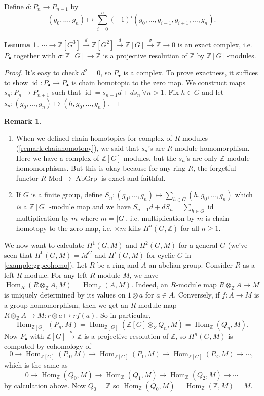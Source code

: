 \documentclass{article}
\newcommand{\Z}{\mathbb{Z}}
\newcommand{\id}{\operatorname{id}}
\newcommand{\Hom}{\operatorname{Hom}}
\newcommand{\AbGrp}{{\operatorname{AbGrp}}}
\theoremstyle{definition}
\newtheorem{lemma}[defn]{Lemma}
\newtheorem{remark}[defn]{Remark}
\begin{document}
Define $d:P_n\rightarrow P_{n-1}$ by \[(g_0,\ldots,g_n)\mapsto\sum_{i=0}^n (-1)^i (g_0,\ldots,g_{i-1},g_{i+1},\ldots,g_n).\]

\begin{lemma}
$\cdots\rightarrow\Z[G^3]\xrightarrow{d}\Z[G^2]\xrightarrow{d}\Z[G]\xrightarrow{\sigma}\Z\rightarrow 0$ is an exact complex, i.e. $P_\bullet$ together with $\sigma:\Z[G]\rightarrow\Z$ is a projective resolution of $\Z$ by $\Z[G]$-modules.
\end{lemma}
\begin{proof}
It's easy to check $d^2=0$, so $P_\bullet$ is a complex. To prove exactness, it suffices to show $\id:P_\bullet\rightarrow P_\bullet$ is chain homotopic to the zero map. We construct maps $s_n:P_n\rightarrow P_{n+1}$ such that $\id=s_{n-1}d+ds_n \ \forall n>1$. Fix $h\in G$ and let $s_n:(g_0,\ldots,g_n)\mapsto (h,g_0,\ldots,g_n)$.
\end{proof}

\begin{remark}
\begin{enumerate}
\item When we defined chain homotopies for complex of $R$-modules (\ref{remark:chainhomotopy}), we said that $s_n$'s are $R$-module homomorphism. Here we have a complex of $\Z[G]$-modules, but the $s_n$'s are only $\Z$-module homomorphisms. But this is okay because for any ring $R$, the forgetful functor $R\text{-Mod}\rightarrow\AbGrp$ is exact and faithful.
\item If $G$ is a finite group, define $S_n:(g_0,\ldots,g_n)\mapsto \sum_{h\in G}(h,g_0,\ldots,g_n)$ which \textit{is} a $\Z[G]$-module map and we have $S_{n-1}d+dS_n=\sum_{h\in G}\id=$ multiplication by $m$ where $m=|G|$, i.e. multiplication by $m$ is chain homotopy to the zero map, i.e. $\times m$ kills $H^n(G,\Z)$ for all $n\geq 1$. 
\end{enumerate}
\end{remark}

We now want to calculate $H^1(G,M)$ and $H^2(G,M)$ for a general $G$ (we've seen that $H^0(G,M)=M^G$ and $H^i(G,M)$ for cyclic $G$ in \ref{example:grpcohomo}). Let $R$ be a ring and $A$ an abelian group. Consider $R$ as a left $R$-module. For any left $R$-module $M$, we have $\Hom_R(R\otimes_\Z A,M)=\Hom_\Z(A,M)$. Indeed, an $R$-module map $R\otimes_\Z A\rightarrow M$ is uniquely determined by its values on $1\otimes a$ for $a\in A$. Conversely, if $f:A\rightarrow M$ is a group homomorphism, then we get an $R$-module map $R\otimes_\Z A\rightarrow M:r\otimes a\mapsto rf(a)$. So in particular,
\[
\Hom_{\Z[G]}(P_n,M)=\Hom_{\Z[G]}(\Z[G]\otimes_Z Q_n,M)=\Hom_\Z(Q_n,M).
\]
Now $P_\bullet$ with $\Z[G]\xrightarrow{\sigma}\Z$ is a projective resolution of $\Z$, so $H^n(G,M)$ is computed by cohomology of
\[
0\rightarrow\Hom_{\Z[G]}(P_0,M)\rightarrow\Hom_{\Z[G]}(P_1,M)\rightarrow\Hom_{\Z[G]}(P_2,M)\rightarrow\cdots,
\]
which is the same as
\[
0\rightarrow\Hom_\Z(Q_0,M)\rightarrow\Hom_\Z(Q_1,M)\rightarrow\Hom_\Z(Q_2,M)\rightarrow\cdots
\]
by calculation above. Now $Q_0=\Z$ so $\Hom_\Z(Q_0,M)=\Hom_\Z(\Z,M)=M$.
\end{document}
